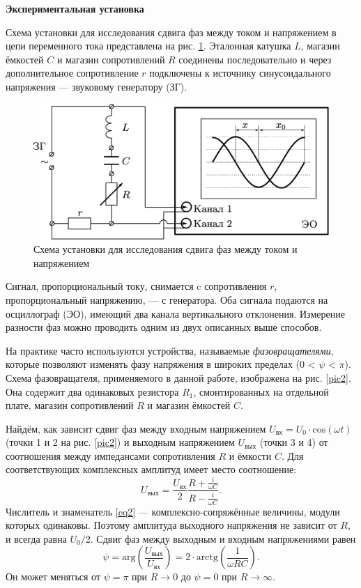 \documentclass[a4paper, 12pt]{article}
\begin{document}
    \newpage
    
    \begin{flushleft}
        {\Large {\bf Экспериментальная установка}}
    \end{flushleft}
    
    Схема установки для исследования сдвига фаз между током и напряжением в цепи переменного тока представлена на рис. \ref{pic1}. Эталонная катушка $L$, магазин ёмкостей $C$ и магазин сопротивлений $R$ соединены последовательно и через дополнительное сопротивление $r$ подключены к источнику синусоидального напряжения — звуковому генератору (ЗГ).
    
    \begin{figure}[ht]
        \centering
        \includegraphics[width=0.5\linewidth]{images/picture1.png}
        \caption{Схема установки для исследования сдвига фаз между током и напряжением}
        \label{pic1}
    \end{figure}
    
    Сигнал, пропорциональный току, снимается c сопротивления $r$, пропорциональный напряжению, — с генератора. Оба сигнала подаются на осциллограф (ЭО), имеющий два канала вертикального отклонения. Измерение разности фаз можно проводить одним из двух описанных выше способов.
    
    На практике часто используются устройства, называемые \textit{фазовращателями}, которые позволяют изменять фазу напряжения в широких пределах (0 < $\psi$ < $\pi$). Схема фазовращателя, применяемого в данной работе, изображена на рис. \ref{pic2}. Она содержит два одинаковых резистора $R_1$, смонтированных на отдельной плате, магазин сопротивлений $R$ и магазин ёмкостей $C$.
    
    Найдём, как зависит сдвиг фаз между входным напряжением $U_{вх} = U_0 \cdot \mathrm{cos}(\omega t)$ (точки 1 и 2 на рис. \ref{pic2}) и выходным напряжением $U_{вых}$ (точки 3 и 4) от соотношения между импедансами сопротивления $R$ и ёмкости $C$. Для соответствующих комплексных амплитуд имеет место соотношение:
    \begin{equation}
        U_{вых} = \frac{U_{вх}}{2} \frac{R + \frac{i}{\omega C}}{R - \frac{i}{\omega C}}.
        \label{eq2}
    \end{equation}
    Числитель и знаменатель \eqref{eq2} — комплексно-сопряжённые величины, модули которых одинаковы. Поэтому амплитуда выходного напряжения не зависит от $R$, и всегда равна $U_0 / 2$. Сдвиг фаз между выходным и входным напряжениями равен
    \begin{equation}
        \psi = \mathrm{arg} \left( \frac{U_{вых}}{U_{вх}} \right) = 2 \cdot \mathrm{arctg} \left( \frac{1}{\omega R C} \right).
        \label{eq3}
    \end{equation}
    Он может меняться от $\psi = \pi$ при $R \rightarrow 0$ до $\psi = 0$ при $R \rightarrow \infty$.
    
\end{document}

